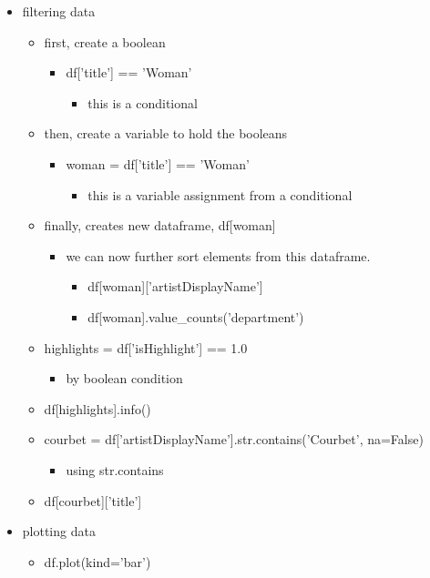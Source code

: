 \documentclass[11pt]{article}
\begin{document}
\begin{itemize}
\begin{itemize}
\begin{itemize}
\end{itemize}
\end{itemize}
\item filtering data
\begin{itemize}
\item first, create a boolean
\begin{itemize}
\item df['title'] == 'Woman'
\begin{itemize}
\item this is a conditional
\end{itemize}
\end{itemize}
\item then, create a variable to hold the booleans
\begin{itemize}
\item woman = df['title'] == 'Woman'
\begin{itemize}
\item this is a variable assignment from a conditional
\end{itemize}
\end{itemize}
\item finally, creates new dataframe, df[woman]
\begin{itemize}
\item we can now further sort elements from this dataframe.
\begin{itemize}
\item df[woman]['artistDisplayName']
\item df[woman].value\_counts('department')
\end{itemize}
\end{itemize}
\item highlights = df['isHighlight'] == 1.0
\begin{itemize}
\item by boolean condition
\end{itemize}
\item df[highlights].info()
\item courbet = df['artistDisplayName'].str.contains('Courbet',
na=False)
\begin{itemize}
\item using str.contains
\end{itemize}
\item df[courbet]['title']
\end{itemize}
\item plotting data
\begin{itemize}
\item df.plot(kind='bar')

\end{itemize}
\end{itemize}
\end{document}
